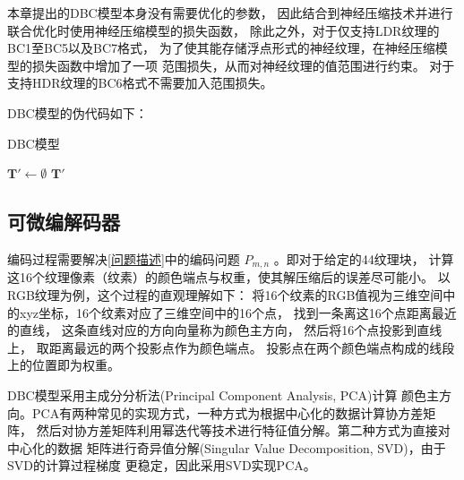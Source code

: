 本章提出的DBC模型本身没有需要优化的参数，
因此结合到神经压缩技术并进行联合优化时使用神经压缩模型的损失函数，
除此之外，对于仅支持LDR纹理的BC1至BC5以及BC7格式，
为了使其能存储浮点形式的神经纹理，在神经压缩模型的损失函数中增加了一项
范围损失，从而对神经纹理的值范围进行约束。
对于支持HDR纹理的BC6格式不需要加入范围损失。

DBC模型的伪代码如下：

\begin{algorithm}[H]
    \caption{DBC模型}
    $\mathbf{T}' \gets \emptyset$ \;
    \Return $\mathbf{T}'$
\end{algorithm}

\subsection{可微编解码器}

编码过程需要解决\ref{问题描述}中的编码问题 $P_{m,n}$ 。即对于给定的4\times4纹理块，
计算这16个纹理像素（纹素）的颜色端点与权重，使其解压缩后的误差尽可能小。
以RGB纹理为例，这个过程的直观理解如下：
将16个纹素的RGB值视为三维空间中的xyz坐标，16个纹素对应了三维空间中的16个点，
找到一条离这16个点距离最近的直线，
这条直线对应的方向向量称为颜色主方向，
然后将16个点投影到直线上，
取距离最远的两个投影点作为颜色端点。
投影点在两个颜色端点构成的线段上的位置即为权重。

DBC模型采用主成分分析法(Principal Component Analysis, PCA)计算
颜色主方向。PCA有两种常见的实现方式，一种方式为根据中心化的数据计算协方差矩阵，
然后对协方差矩阵利用幂迭代等技术进行特征值分解。第二种方式为直接对中心化的数据
矩阵进行奇异值分解(Singular Value Decomposition, SVD)，由于SVD的计算过程梯度
更稳定，因此采用SVD实现PCA。

